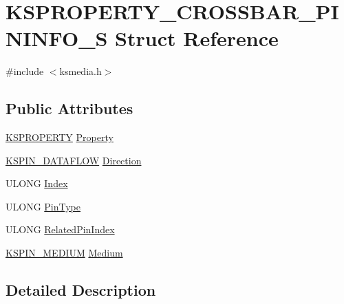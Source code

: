 \hypertarget{struct_k_s_p_r_o_p_e_r_t_y___c_r_o_s_s_b_a_r___p_i_n_i_n_f_o___s}{}\section{K\+S\+P\+R\+O\+P\+E\+R\+T\+Y\+\_\+\+C\+R\+O\+S\+S\+B\+A\+R\+\_\+\+P\+I\+N\+I\+N\+F\+O\+\_\+S Struct Reference}
\label{struct_k_s_p_r_o_p_e_r_t_y___c_r_o_s_s_b_a_r___p_i_n_i_n_f_o___s}


{\ttfamily \#include $<$ksmedia.\+h$>$}

\subsection*{Public Attributes}
\begin{DoxyCompactItemize}
\item 
\hyperlink{ks_8h_a4392f77c74e868d813d46c39ada4d660}{K\+S\+P\+R\+O\+P\+E\+R\+TY} \hyperlink{struct_k_s_p_r_o_p_e_r_t_y___c_r_o_s_s_b_a_r___p_i_n_i_n_f_o___s_a534b8638717a198da8f3e680d0e07b6d}{Property}
\item 
\hyperlink{ks_8h_a56408dcd08fcb4080adbd109cf61c4aa}{K\+S\+P\+I\+N\+\_\+\+D\+A\+T\+A\+F\+L\+OW} \hyperlink{struct_k_s_p_r_o_p_e_r_t_y___c_r_o_s_s_b_a_r___p_i_n_i_n_f_o___s_ac8d1dab79066d18f91675e238dc494f7}{Direction}
\item 
U\+L\+O\+NG \hyperlink{struct_k_s_p_r_o_p_e_r_t_y___c_r_o_s_s_b_a_r___p_i_n_i_n_f_o___s_aa836b6c8758e51f55482dffd7303a0f3}{Index}
\item 
U\+L\+O\+NG \hyperlink{struct_k_s_p_r_o_p_e_r_t_y___c_r_o_s_s_b_a_r___p_i_n_i_n_f_o___s_a50f2eec426a15f29e40e2e65e84b7ce0}{Pin\+Type}
\item 
U\+L\+O\+NG \hyperlink{struct_k_s_p_r_o_p_e_r_t_y___c_r_o_s_s_b_a_r___p_i_n_i_n_f_o___s_a04fbeb9e5c078192398b9e9d6a61928e}{Related\+Pin\+Index}
\item 
\hyperlink{ks_8h_a1e8ded652cd6544c903137c8e662d69f}{K\+S\+P\+I\+N\+\_\+\+M\+E\+D\+I\+UM} \hyperlink{struct_k_s_p_r_o_p_e_r_t_y___c_r_o_s_s_b_a_r___p_i_n_i_n_f_o___s_a609d319651ca9a3777360f3269e214be}{Medium}
\end{DoxyCompactItemize}


\subsection{Detailed Description}


